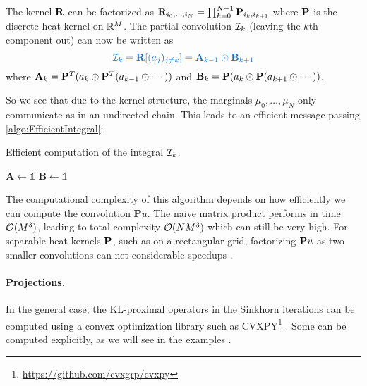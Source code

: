 \documentclass[../report.tex]{subfiles}
\begin{document}
\begin{prop}\label{prop:efficientConvol}
The kernel $\mathbf{R}$ can be factorized as $\mathbf{R}_{i_0,\ldots,i_N} = \prod_{k=0}^{N-1} \mathbf{P}_{i_k,i_{k+1}}$ where $\mathbf{P}$ is the discrete heat kernel on $\mathbb{R}^M$. The partial convolution $\mathcal{I}_k$ (leaving the $k$th component out) can now be written as
\begin{equation}
{\bluefont
	\calI_k = \bfR[(a_j)_{j\neq k}] =
	\mathbf{A}_{k-1} \odot \mathbf{B}_{k+1}
}
\end{equation}
where $\mathbf{A}_{k} = \mathbf{P}^T (a_k \odot \mathbf{P}^T(a_{k-1} \odot \cdots))$ and $\mathbf{B}_k = \mathbf{P} (a_k \odot \mathbf{P} (a_{k+1}\odot \cdots))$.
\end{prop}
So we see that due to the kernel structure, the marginals $\mu_0,\ldots,\mu_N$ only communicate as in an undirected chain. This leads to an efficient message-passing \cref{algo:EfficientIntegral}:
\begin{algorithm}[h]
\caption{Efficient computation of the integral $\mathcal{I}_k$.}\label{algo:EfficientIntegral}
$\mathbf{A} \leftarrow \mathds{1}$\;
$\mathbf{B} \leftarrow \mathds{1}$\;
\;
\end{algorithm}

The computational complexity of this algorithm depends on how efficiently we can compute the convolution $\mathbf{P}u$. The naive matrix product performs in time $\mathcal{O}(M^3)$, leading to total complexity $\mathcal{O}(NM^3)$ which can still be very high. For separable heat kernels $\mathbf{P}$, such as on a rectangular grid, factorizing $\mathbf{P} u$ as two smaller convolutions can net considerable speedups \parencite[p.~74]{peyr2018computational}.

\paragraph{Projections.}
In the general case, the KL-proximal operators in the Sinkhorn iterations can be computed using a convex optimization library such as CVXPY\footnote{\url{https://github.com/cvxgrp/cvxpy}} \cite{cvxpy}. Some can be computed explicitly, as we will see in the examples .
\end{document}
